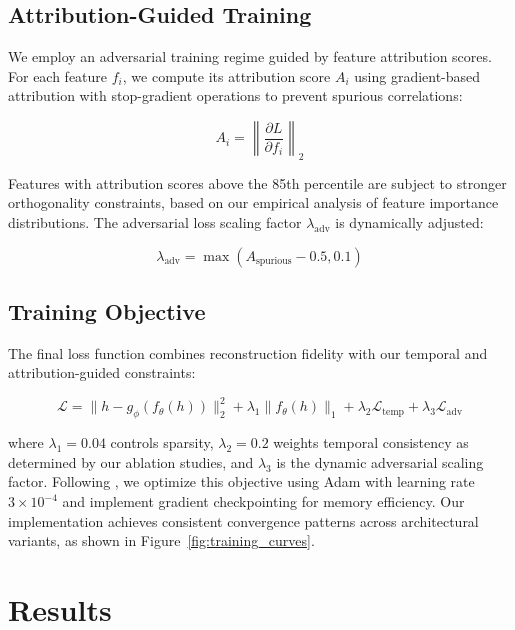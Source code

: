 \documentclass{article} %
\begin{document}
\subsection{Attribution-Guided Training}
We employ an adversarial training regime guided by feature attribution scores. For each feature $f_i$, we compute its attribution score $A_i$ using gradient-based attribution with stop-gradient operations to prevent spurious correlations:

\begin{equation}
    A_i = \left\|\frac{\partial L}{\partial f_i}\right\|_2
\end{equation}

Features with attribution scores above the 85th percentile are subject to stronger orthogonality constraints, based on our empirical analysis of feature importance distributions. The adversarial loss scaling factor $\lambda_{\text{adv}}$ is dynamically adjusted:

\begin{equation}
    \lambda_{\text{adv}} = \max(A_{\text{spurious}} - 0.5, 0.1)
\end{equation}

\subsection{Training Objective}
The final loss function combines reconstruction fidelity with our temporal and attribution-guided constraints:

\begin{equation}
    \mathcal{L} = \|h - g_\phi(f_\theta(h))\|_2^2 + \lambda_1\|f_\theta(h)\|_1 + \lambda_2\mathcal{L}_{\text{temp}} + \lambda_3\mathcal{L}_{\text{adv}}
\end{equation}

where $\lambda_1=0.04$ controls sparsity, $\lambda_2=0.2$ weights temporal consistency as determined by our ablation studies, and $\lambda_3$ is the dynamic adversarial scaling factor. Following \citet{kingma2014adam}, we optimize this objective using Adam with learning rate $3\times10^{-4}$ and implement gradient checkpointing for memory efficiency. Our implementation achieves consistent convergence patterns across architectural variants, as shown in Figure~\ref{fig:training_curves}.


\section{Results}
\label{sec:results}
\end{document}

